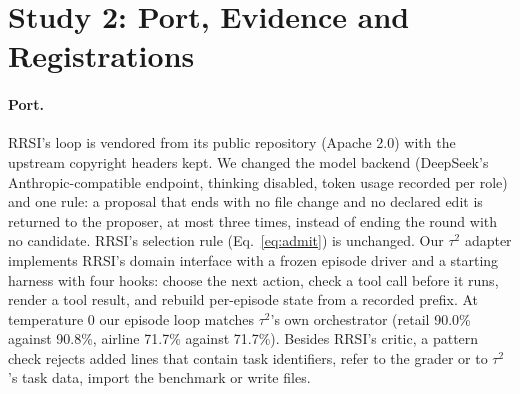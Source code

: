 \documentclass[11pt]{article}
\begin{document}
\section{Study 2: Port, Evidence and Registrations}
\label{app:rrsi}

\paragraph{Port.} RRSI's loop is vendored from its public repository (Apache 2.0) with the upstream copyright headers kept. We changed the model backend (DeepSeek's Anthropic-compatible endpoint, thinking disabled, token usage recorded per role) and one rule: a proposal that ends with no file change and no declared edit is returned to the proposer, at most three times, instead of ending the round with no candidate. RRSI's selection rule (Eq.~\ref{eq:admit}) is unchanged. Our $\tau^2$ adapter implements RRSI's domain interface with a frozen episode driver and a starting harness with four hooks: choose the next action, check a tool call before it runs, render a tool result, and rebuild per-episode state from a recorded prefix. At temperature 0 our episode loop matches $\tau^2$'s own orchestrator (retail 90.0\% against 90.8\%, airline 71.7\% against 71.7\%). Besides RRSI's critic, a pattern check rejects added lines that contain task identifiers, refer to the grader or to $\tau^2$'s task data, import the benchmark or write files.

\begin{table}[t]
\centering
\small
\setlength{\tabcolsep}{3pt}
\caption{Evidence compared in Study 2, per candidate, with $b\in\{10,40,80\}$; full evaluation costs 148 (retail) or 60 (airline) episodes. The priors have means 0.41 or 0.29 (audited analyst accuracy), 0.7 and 0.2. Every rule decides with RRSI's selection rule.}
\label{tab:evidence}
\end{table}
\end{document}
